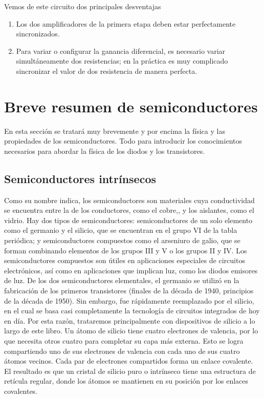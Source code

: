Vemos de este circuito dos principales desventajas 

\begin{enumerate}
    \item Los dos amplificadores de la primera etapa deben estar perfectamente sincronizados.
    \item Para variar o configurar la ganancia diferencial, es necesario variar simultáneamente dos resistencias; en la práctica es muy complicado sincronizar el valor de dos resistencia de manera perfecta.
\end{enumerate}

\section{Breve resumen de semiconductores}

En esta sección se tratará muy brevemente y por encima la física y las propiedades de los semiconductores. Todo para introducir los conocimientos necesarios para abordar la física de los diodos y los transistores.

\subsection{Semiconductores intrínsecos}

Como su nombre indica, los semiconductores son materiales cuya conductividad se encuentra entre la de los conductores, como el cobre,, y los aislantes, como el vidrio. Hay dos tipos de semiconductores: semiconductores de un solo elemento como el germanio y el silicio, que se encuentran en el grupo VI de la tabla periódica; y semiconductores compuestos como el arseniuro de galio, que se forman combinando elementos de los grupos III y V o los grupos II y IV. Los semiconductores compuestos son útiles en aplicaciones especiales de circuitos electrónicos, así como en aplicaciones que implican luz, como los diodos emisores de luz. De los dos semiconductores elementales, el germanio se utilizó en la fabricación de los primeros transistores (finales de la década de 1940, principios de la década de 1950). Sin embargo, fue rápidamente reemplazado por el silicio, en el cual se basa casi completamente la tecnología de circuitos integrados de hoy en día. Por esta razón, trataremos principalmente con dispositivos de silicio a lo largo de este libro. Un átomo de silicio tiene cuatro electrones de valencia, por lo que necesita otros cuatro para completar su capa más externa. Esto se logra compartiendo uno de sus electrones de valencia con cada uno de sus cuatro átomos vecinos. Cada par de electrones compartidos forma un enlace covalente. El resultado es que un cristal de silicio puro o intrínseco tiene una estructura de retícula regular, donde los átomos se mantienen en su posición por los enlaces covalentes. \\

